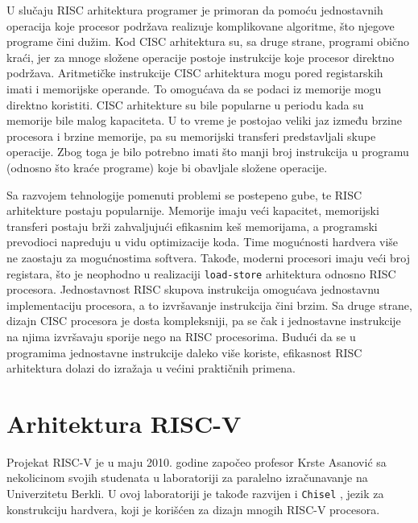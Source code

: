 \documentclass[12pt,oneside]{memoir}
\begin{document}
U slučaju RISC arhitektura programer je primoran da pomoću jednostavnih operacija koje procesor podržava realizuje komplikovane algoritme, što njegove programe čini dužim. Kod CISC arhitektura su, sa druge strane, programi obično kraći, jer za mnoge složene operacije postoje instrukcije koje procesor direktno podržava. Aritmetičke instrukcije CISC arhitektura mogu pored registarskih imati i memorijske operande. To omogućava da se podaci iz memorije mogu direktno koristiti. CISC arhitekture su bile popularne u periodu kada su memorije bile malog kapaciteta. U to vreme je postojao veliki jaz između brzine procesora i brzine memorije, pa su memorijski transferi predstavljali skupe operacije. Zbog toga je bilo potrebno imati što manji broj instrukcija u programu (odnosno što kraće programe) koje bi obavljale složene operacije. 

Sa razvojem tehnologije pomenuti problemi se postepeno gube, te RISC arhitekture postaju popularnije. Memorije imaju veći kapacitet, memorijski transferi postaju brži zahvaljujući efikasnim keš memorijama, a programski prevodioci napreduju u vidu optimizacije koda. Time mogućnosti hardvera više ne zaostaju za mogućnostima softvera. Takođe, moderni procesori imaju veći broj registara, što je neophodno u realizaciji \texttt{load-store} arhitektura odnosno RISC procesora. Jednostavnost RISC skupova instrukcija omogućava jednostavnu implementaciju procesora, a to izvršavanje instrukcija čini brzim. Sa druge strane, dizajn CISC procesora je dosta kompleksniji, pa se čak i jednostavne instrukcije na njima izvršavaju sporije nego na RISC procesorima. Budući da se u programima jednostavne instrukcije daleko više koriste, efikasnost RISC arhitektura dolazi do izražaja u većini praktičnih primena.  

\section{Arhitektura RISC-V}
 
Projekat RISC-V je u maju 2010. godine započeo profesor Krste Asanović sa nekolicinom svojih studenata u laboratoriji za paralelno izračunavanje na Univerzitetu Berkli. U ovoj laboratoriji je takođe razvijen i \texttt{Chisel} \cite{chisel}, jezik za konstrukciju hardvera, koji je korišćen za dizajn mnogih RISC-V procesora. 
\end{document}
